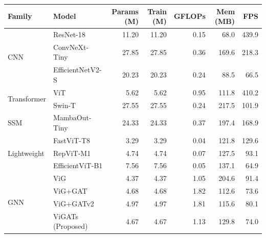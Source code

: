 \documentclass[]{interact}
\theoremstyle{plain}
\theoremstyle{definition}
\theoremstyle{remark}
\begin{document}
{\begin{table}[H]
\small
\setlength{\tabcolsep}{3pt}
{\begin{tabular}{llrrrrr} \toprule
\textbf{Family} & \textbf{Model} & \textbf{Params (M)} & \textbf{Train (M)} & \textbf{GFLOPs} & \textbf{Mem (MB)} & \textbf{FPS} \\ \midrule
\multirow{3}{*}{CNN}
 & ResNet-18 \citep{he2016deep}           & 11.20 & 11.20 & \textcolor{secondorange}{0.15} & \textcolor{bestblue}{68.0}  & \textcolor{bestblue}{439.9} \\
 & ConvNeXt-Tiny \citep{liu2022convnext}  & 27.85 & 27.85 & 0.36 & 169.6 & 218.3 \\
 & EfficientNetV2-S \citep{tan2021efficientnetv2} & 20.23 & 20.23 & 0.24 & \textcolor{secondorange}{88.5} & 66.5 \\ \midrule
\multirow{2}{*}{Transformer}
 & ViT \citep{dosovitskiy2020image}       & 5.62  & 5.62  & 0.95 & 111.8 & \textcolor{secondorange}{410.2} \\
 & Swin-T \citep{liu2021swin}             & 27.55 & 27.55 & 0.24 & 217.5 & 101.9 \\ \midrule
SSM
 & MambaOut-Tiny \citep{yu2024mambaout}   & 24.33 & 24.33 & 0.37 & 197.4 & 168.9 \\ \midrule
\multirow{3}{*}{Lightweight}
 & FastViT-T8 \citep{vasu2023fastvit}     & \textcolor{bestblue}{3.29}  & \textcolor{bestblue}{3.29}  & \textcolor{bestblue}{0.04} & 121.8 & 129.6 \\
 & RepViT-M1 \citep{wang2024repvit}       & 4.74  & 4.74  & 0.07 & 127.5 & 93.1 \\
 & EfficientViT-B1 \citep{cai2023efficientvit} & 7.56 & 7.56 & 0.05 & 137.1 & 64.9 \\ \midrule
\multirow{4}{*}{GNN}
 & ViG \citep{han2022vision}              & \textcolor{secondorange}{4.37}  & \textcolor{secondorange}{4.37}  & 1.05 & 204.6 & 91.4 \\
 & ViG+GAT \citep{velickovic2018graph}    & 4.68  & 4.68  & 1.82 & 112.6 & 73.6 \\
 & ViG+GATv2 \citep{brody2022gat}         & 4.97  & 4.97  & 1.81 & 115.6 & 80.1 \\
 & ViGATs (Proposed)             & 4.67  & 4.67  & 1.13 & 129.8 & 74.0 \\ \bottomrule
\end{tabular}}
\label{tab:model_complexity}
\end{table}

}
\end{document}
